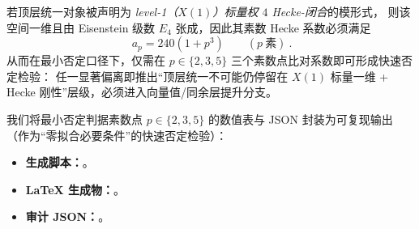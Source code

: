 \begin{corollary}\label{cor:hecke-e4-three-prime-refutation}
若顶层统一对象被声明为 \emph{level-1（\(X(1)\)）标量权 \(4\) Hecke-闭合}的模形式，
则该空间一维且由 Eisenstein 级数 \(E_4\) 张成，因此其素数 Hecke 系数必须满足
\[
\boxed{\ a_p=240(1+p^3)\qquad(p\ \text{素})\ }.
\]
从而在最小否定口径下，仅需在 \(p\in\{2,3,5\}\) 三个素数点比对系数即可形成快速否定检验：
任一显著偏离即推出“顶层统一不可能仍停留在 \(X(1)\) 标量一维 + Hecke 刚性”层级，必须进入向量值/同余层提升分支。
\end{corollary}
\par
我们将最小否定判据素数点 \(p\in\{2,3,5\}\) 的数值表与 JSON 封装为可复现输出（作为“零拟合必要条件”的快速否定检验）：
\begin{itemize}
  \item \textbf{生成脚本：}\texttt{}。
  \item \textbf{LaTeX 生成物：}\texttt{}。
  \item \textbf{审计 JSON：}\texttt{}。
\end{itemize}
